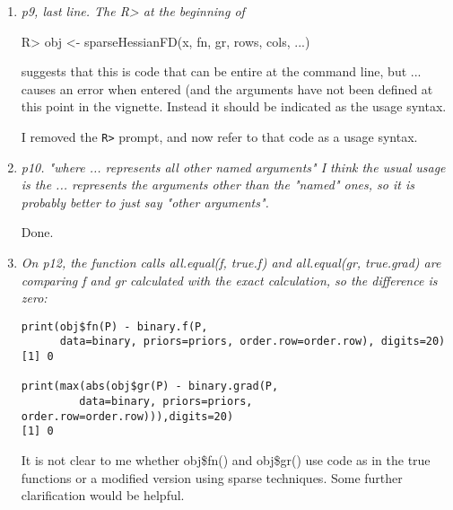 \documentclass{article}
\newcommand{\code}[1]{\texttt{#1}}
\newcommand{\func}[1]{\code{#1}}
\newenvironment{revQuote}{\itshape}{\vspace{\baselineskip}}
\newenvironment{response}{\normalfont}{\vspace{\baselineskip}}
\begin{document}
\begin{enumerate}
\begin{response}
  
\end{response}


\item \begin{revQuote}
p9, last line. The R> at the beginning of
 
   R> obj <- sparseHessianFD(x, fn, gr, rows, cols, ...)

suggests that this is code that can be entire at the command line, but ...
causes an error when entered (and the arguments have not been defined at
this point in the vignette. Instead it should be indicated as the usage
syntax.
  \end{revQuote}

\begin{response}
  I removed the \func{R>} prompt, and now refer to that code as a usage
  syntax.  
\end{response}


\item \begin{revQuote}
p10. "where ... represents all other named arguments"
   I think the usual usage is the ... represents the arguments other than
the "named" ones, so it is probably better to just say "other arguments".
  \end{revQuote}

\begin{response}
  Done.
\end{response}


\item \begin{revQuote}
On p12, the function calls all.equal(f, true.f) and all.equal(gr,
true.grad) are comparing f and gr calculated with the exact calculation, so
the difference is zero:

\begin{verbatim}
print(obj$fn(P) - binary.f(P, 
      data=binary, priors=priors, order.row=order.row), digits=20)
[1] 0

print(max(abs(obj$gr(P) - binary.grad(P, 
         data=binary, priors=priors,
order.row=order.row))),digits=20)
[1] 0

\end{verbatim}

It is not clear to me whether obj\$fn() and obj\$gr() use code as in the true
functions or a modified version using sparse techniques. Some further
clarification would be helpful.


\end{revQuote}
\end{enumerate}
\end{document}
